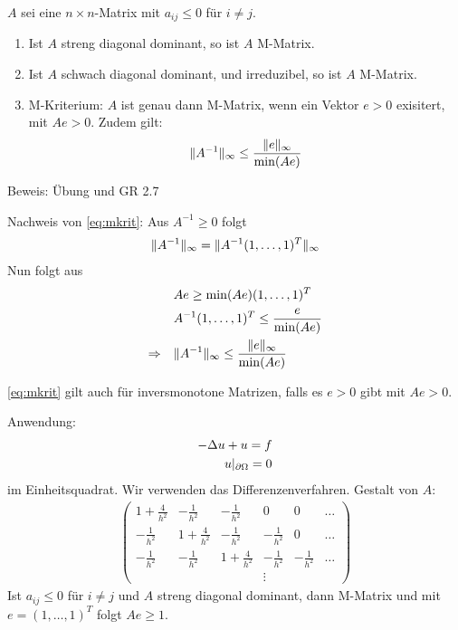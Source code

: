 \begin{satz}
\renewcommand{\labelenumi}{(\roman{enumi})}
  $A$ sei eine $n \times n$-Matrix mit $a_{ij} \leq 0$ für $i \neq j$.
  \begin{enumerate}
  \item Ist $A$ streng  diagonal dominant, so ist $A$ M-Matrix.
  \item Ist $A$ schwach diagonal dominant, und irreduzibel, so ist $A$ M-Matrix.
\item M-Kriterium: $A$ ist genau dann M-Matrix, wenn ein Vektor $e > 0$ exisitert, mit $Ae > 0$. Zudem gilt: 
  \begin{align}\label{eq:mkrit}
    \|A^{-1}\|_\infty \leq \frac{\|e\| _\infty}{\min(Ae)}
  \end{align}
  \end{enumerate}

Beweis: Übung und GR 2.7
\end{satz}
Nachweis von \eqref{eq:mkrit}: Aus $A^{-1} \geq 0$ folgt 
\begin{align*}
  \|A^{-1}\|_\infty = \|A^{-1}(1, \dots, 1)^T\|_\infty
\end{align*}
Nun folgt aus 
\begin{align*}
& Ae \geq \min(Ae) (1, \dots, 1)^T\\
&A^{-1} (1, \dots, 1)^T \leq \frac e {\min (Ae)}\\
\Rightarrow  \quad&\|A^{-1}\|_\infty \leq \frac{\|e\| _\infty}{\min(Ae)}
\end{align*}

\eqref{eq:mkrit} gilt auch für inversmonotone Matrizen, falls es $e > 0$ gibt mit $Ae > 0$.

\begin{beispiel} Anwendung:
  \begin{align*}
    - \Delta u + u = f\\
u|_{\partial \Omega} = 0
  \end{align*}
im Einheitsquadrat. Wir verwenden das Differenzenverfahren. Gestalt von $A$:  
\begin{align*}
  \begin{pmatrix}
    1 + \frac 4 {h^2} & - \frac 1 {h^2} & - \frac 1 {h^2} & 0 & 0 & \dots \\
- \frac 1 {h^2} & 1 + \frac 4 {h^2} & - \frac 1 {h^2} & - \frac 1 {h^2} & 0 &  \dots \\
- \frac 1 {h^2} &- \frac 1 {h^2} & 1 + \frac 4 {h^2} & - \frac 1 {h^2} & - \frac 1 {h^2}  &  \dots \\
 & & & \vdots
  \end{pmatrix}
\end{align*}
Ist $a_{ij} \leq 0$ für $i \neq j$ und $A$ streng diagonal dominant, dann M-Matrix und mit $e = (1, \dots, 1)^T$ folgt $Ae \geq 1$.
\end{beispiel}

